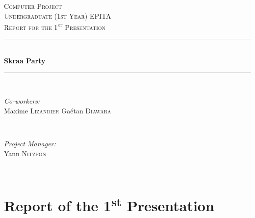 \documentclass[12pt]{article}
\newcommand{\ts}{\textsuperscript}
\newcommand{\HRule}{\rule{\linewidth}{0.5mm}} %
\begin{document}
\begin{center}


 

\textsc{\LARGE Computer Project}\\[1.5cm] %
\textsc{\Large Undergraduate (1st Year) EPITA}\\[0.5cm] %
\textsc{\large Report for the 1\ts{st} Presentation}\\[0.5cm] %



\HRule \\[0.4cm]
{ \huge \bfseries Skraa Party}\\[0.4cm] %
\HRule \\[1.5cm]
 

\begin{minipage}{0.4\textwidth}
\begin{flushleft} \large
\emph{Co-workers:}\\
Maxime \textsc{Lizandier} %
Ga\'etan \textsc{Diawara}
\end{flushleft}
\end{minipage}
~
\begin{minipage}{0.4\textwidth}
\begin{flushright} \large
\emph{Project Manager:} \\
Yann \textsc{Nitzpon} %
\end{flushright}
\end{minipage}\\[2cm]

\end{center} %


\newpage

\section{Report of the 1\ts{st} Presentation}
\end{document}
